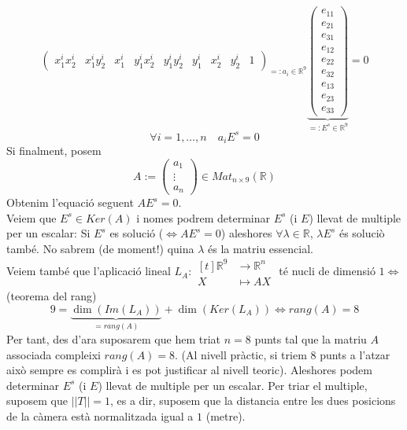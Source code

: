 \documentclass[../main.tex]{subfiles}
\begin{document}
\begin{enumerate}
\begin{displaymath}
{\begin{pmatrix}
							x_1^i x_2^i & x_1^i y_2^i & x_1^i & y_1^i x_2^i & y_1^i y_2^i & y_1^i & x_2^i & y_2^i & 1
			\end{pmatrix}}_{=: a_i \in \mathbb{R}^9}
			\underbrace{\begin{pmatrix}
							e_{11}\\
							e_{21}\\
							e_{31}\\
							e_{12}\\
							e_{22}\\
							e_{32}\\
							e_{13}\\
							e_{23}\\
							e_{33}
			\end{pmatrix}}_{=: E^s \in \mathbb{R}^9} = 0
		\end{displaymath}
		\begin{displaymath}
			\forall i = 1, \dots, n\quad a_iE^s = 0
		\end{displaymath}
		Si finalment, posem
		\begin{displaymath}
			A := \begin{pmatrix}a_1\\ \vdots\\ a_n\end{pmatrix} \in Mat_{n\times9}(\mathbb{R})
		\end{displaymath}
		Obtenim l'equació seguent $AE^s = 0$.\\
		Veiem que $E^s \in Ker(A)$ i nomes podrem determinar $E^s$ (i $E$) llevat de multiple per un escalar:
		Si $E^s$ es solució ($\Leftrightarrow AE^s = 0$) aleshores $\forall \lambda \in \mathbb{R}$, $\lambda E^s$ és soluciò també. No sabrem (de moment!) quina $\lambda$ és la matriu essencial.\\
		Veiem també que l'aplicació lineal $L_A: \begin{aligned}[t]\mathbb{R}^9 &\to \mathbb{R}^n\\X &\mapsto AX\end{aligned}$ té nucli de dimensió $1 \iff$ (teorema del rang)
	 	\begin{displaymath}
				9 = \underbrace{\dim(Im(L_A))}_{= rang(A)} + \dim(Ker(L_A)) \iff rang(A) = 8
		\end{displaymath}
		Per tant, des d'ara suposarem que hem triat $n = 8$ punts tal que la matriu $A$ associada compleixi $rang(A) = 8$.
		(Al nivell pràctic, si triem $8$ punts a l'atzar això sempre es complirà i es pot justificar al nivell teoric).
		Aleshores podem determinar $E^s$ (i $E$) llevat de multiple per un escalar. Per triar el multiple, suposem que $||T|| = 1$, es a dir, suposem que la distancia entre les dues posicions de la càmera està normalitzada igual a $1$ (metre).

\end{enumerate}
\end{document}
